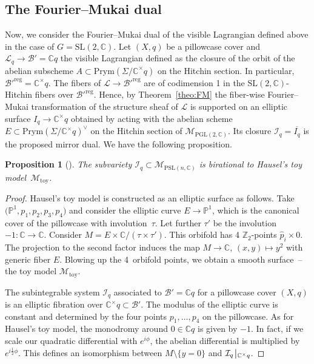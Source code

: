 \documentclass[10pt,a4paper]{amsart}
\numberwithin{equation}{section}
\newtheorem{prop}[theo]{Proposition}
\theoremstyle{definition}
\newcommand{\reg}{\mathrm{reg}}
\newcommand{\toy}{\mathrm{toy}}
\newcommand{\rest}{\: \rule[-3.5pt]{0.5pt}{11.5pt}\,{}}
\renewcommand{\to}{\rightarrow}
\newcommand{\wh}{\widehat}
\newcommand{\calB}{\mathcal{B}}
\newcommand{\calI}{\mathcal{I}}
\newcommand{\calL}{\mathcal{L}}
\newcommand{\calM}{\mathcal{M}}
\newcommand{\ZZ}{\mathbb{Z}}
\newcommand{\CC}{\mathbb{C}}
\newcommand{\PP}{\mathbb{P}}
\newcommand{\Prym}{\mathrm{Prym}}
\newcommand{\SL}{\mathrm{SL}}
\newcommand{\PSL}{\mathrm{PSL}}
\newcommand{\PGL}{\mathrm{PGL}}
\begin{document}
\subsection{The Fourier--Mukai dual}
Now, we consider the Fourier--Mukai dual of the visible Lagrangian defined above in the case of $G=\SL(2,\CC)$. Let $(X,q)$ be a pillowcase cover and $\calL_q \to \calB'=\CC q$ the visible Lagrangian defined as the closure of the orbit of the abelian subscheme $A \subset \Prym(\Sigma/\CC^\times q)$ on the Hitchin section. In particular, $\calB'^\reg=\CC^\times q$. The fibers of $\calL \to \calB'^\reg$ are of codimension 1 in the $\SL(2,\CC)$-Hitchin fibers over $\calB'^\reg$. Hence, by Theorem~\ref{theo:FM} the fiber-wise Fourier--Mukai transformation of the structure sheaf of $\calL$ is supported on an elliptic surface $I_q \rightarrow \CC^\times q$ obtained by acting with the abelian scheme $E \subset \Prym(\Sigma/\CC^\times q)^\vee$ on the Hitchin section of $\calM_{\PGL(2,\CC)}$. Its closure $\calI_q=\overline{I_q}$ is the proposed mirror dual. We have the following proposition.
\begin{prop}[\cite{HauselToy}]\label{prop:Hausel_toy} The subvariety $\calI_q \!\subset\! \calM_{\PSL(n,\CC)}$ is birational to Hausel's toy model~$\calM_\toy$.
\end{prop}
\begin{proof}
 Hausel's toy model is constructed as an elliptic surface as follows. Take $\bigl(\PP^1,p_1,p_2,p_3,p_4\bigr)$ and consider the elliptic curve $E \to \PP^1$, which is the canonical cover of the pillowcase with involution~$\tau$. Let further $\tau'$ be the involution $-1\colon \CC \to \CC$. Consider $M=E \times \CC/(\tau \times \tau')$. This orbifold has 4 $\ZZ_2$-points $\wh{p}_i \times 0$. The projection to the second factor induces the map $M \to \CC$, $(x,y) \mapsto y^2 $ with generic fiber $E$. Blowing up the 4~orbifold points, we obtain a smooth surface~-- the toy model $\calM_{\toy}$.

 The subintegrable system $\calI_q$ associated to $\calB'=\CC q$ for a pillowcase cover $(X,q)$ is an elliptic fibration over $\CC^\times q \subset \calB'$. The modulus of the elliptic curve is constant and determined by the four points $p_1,\dots,p_4$ on the pillowcase. As for Hausel's toy model, the monodromy around $0 \in \CC q$ is given by $-1$. In fact, if we scale our quadratic differential with $e^{i\phi}$, the abelian differential is multiplied by $e^{i\frac12 \phi}$. This defines an isomorphism between $M\setminus{\{y=0\}}$ and $\calI_q \rest_{\CC^\times q}$.
\end{proof}
\end{document}

